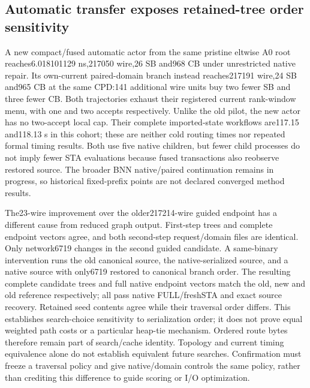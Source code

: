 \documentclass[conference,10pt]{IEEEtran}
\begin{document}
\subsection{Automatic transfer exposes retained-tree order sensitivity}
A new compact/fused automatic actor from the same pristine eltwise A0 root reaches6.018101129 ns,217050 wire,26 SB and968 CB under unrestricted native repair. Its own-current paired-domain branch instead reaches217191 wire,24 SB and965 CB at the same CPD:141 additional wire units buy two fewer SB and three fewer CB. Both trajectories exhaust their registered current rank-window menu, with one and two accepts respectively. Unlike the old pilot, the new actor has no two-accept local cap. Their complete imported-state workflows are117.15 and118.13 s in this cohort; these are neither cold routing times nor repeated formal timing results. Both use five native children, but fewer child processes do not imply fewer STA evaluations because fused transactions also reobserve restored source. The broader BNN native/paired continuation remains in progress, so historical fixed-prefix points are not declared converged method results.

The23-wire improvement over the older217214-wire guided endpoint has a different cause from reduced graph output. First-step trees and complete endpoint vectors agree, and both second-step request/domain files are identical. Only network6719 changes in the second guided candidate. A same-binary intervention runs the old canonical source, the native-serialized source, and a native source with only6719 restored to canonical branch order. The resulting complete candidate trees and full native endpoint vectors match the old, new and old reference respectively; all pass native FULL/freshSTA and exact source recovery. Retained seed contents agree while their traversal order differs. This establishes search-choice sensitivity to serialization order; it does not prove equal weighted path costs or a particular heap-tie mechanism. Ordered route bytes therefore remain part of search/cache identity. Topology and current timing equivalence alone do not establish equivalent future searches. Confirmation must freeze a traversal policy and give native/domain controls the same policy, rather than crediting this difference to guide scoring or I/O optimization.
\end{document}
